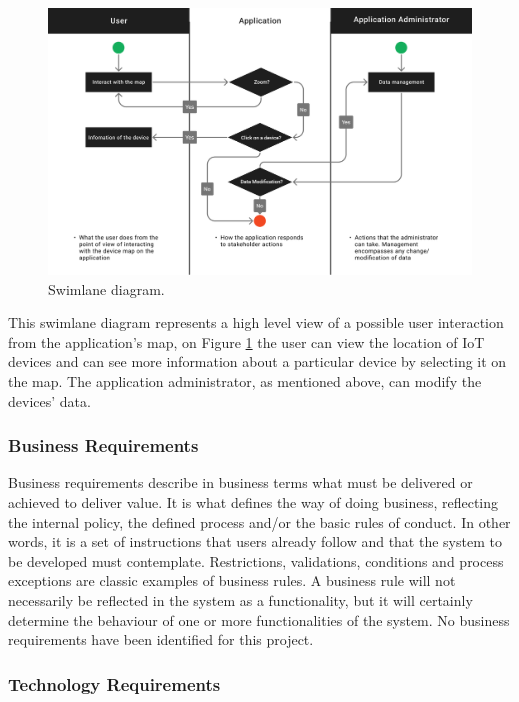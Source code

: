 \begin{figure}[H]
    \centering
    \includegraphics[width=15cm]{../app/docs/software_requirements/assets/images/swimlane_diagram.png}
    \caption{Swimlane diagram.}
    \label{fig:diagram swimlane}
\end{figure}

This swimlane diagram represents a high level view of a possible user interaction
from the application's map, on Figure \ref{fig:diagram swimlane} the user can view the location of
IoT devices and can see more information about a particular device by selecting
it on the map. The application administrator, as mentioned above, can modify the
devices' data.

\subsubsection{Business Requirements}

Business requirements describe in business terms what must be delivered
or achieved to deliver value. It is what defines the way of doing business,
reflecting the internal policy, the defined process and/or the basic rules
of conduct.  In other words, it is a set of instructions that users already
follow and that the system to be developed must contemplate. Restrictions,
validations, conditions and process exceptions are classic examples of business
rules. A business rule will not necessarily be reflected in the system as
a functionality, but it will certainly determine the behaviour of one or
more functionalities of the system.
\newline
No business requirements have been identified for this project.

\subsubsection{Technology Requirements}

